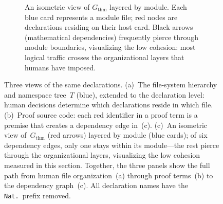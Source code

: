 \begin{figure}[H]
\begin{subfigure}[b]{\textwidth}
\caption{An isometric view of $G_{\mathrm{thm}}$ layered by module. Each \textcolor{blue!60!black}{blue card} represents a module file; \textcolor{red!70!black}{red nodes} are declarations residing on their host card. Black arrows (mathematical dependencies) frequently pierce through module boundaries, visualizing the low cohesion: most logical traffic crosses the organizational layers that humans have imposed.}
\label{fig:dep-view}
\end{subfigure}
\caption{Three views of the same declarations. (a)~The file-system hierarchy and namespace tree~$T$ (\textcolor{blue!60!black}{blue}), extended to the declaration level: human decisions determine which declarations reside in which file. (b)~Proof source code: each \textcolor{red!70!black}{red identifier} in a proof term is a premise that creates a dependency edge in~(c). (c)~An isometric view of~$G_{\mathrm{thm}}$ (red arrows) layered by module (\textcolor{blue!60!black}{blue cards}); of six dependency edges, only one stays within its module---the rest pierce through the organizational layers, visualizing the low cohesion measured in this section. Together, the three panels show the full path from human file organization~(a) through proof terms~(b) to the dependency graph~(c). All declaration names have the \texttt{Nat.}\ prefix removed.}
\label{fig:module-region}
\end{figure}

